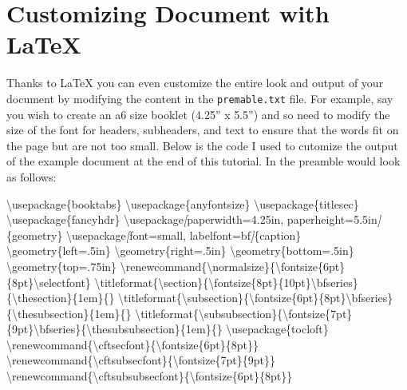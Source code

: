 \documentclass[
]{book}
\newenvironment{Shaded}{\begin{snugshade}}{\end{snugshade}}
\newcommand{\CommentTok}[1]{\textcolor[rgb]{0.56,0.35,0.01}{\textit{#1}}}
\newcommand{\NormalTok}[1]{#1}
\newcommand{\OtherTok}[1]{\textcolor[rgb]{0.56,0.35,0.01}{#1}}
\theoremstyle{definition}
\theoremstyle{definition}
\theoremstyle{definition}
\theoremstyle{definition}
\theoremstyle{remark}
\begin{document}
\section{Customizing Document with LaTeX}\label{customizing-document-with-latex}

Thanks to LaTeX you can even customize the entire look and output of your document by modifying the content in the \texttt{premable.txt} file. For example, say you wish to create an a6 size booklet (4.25'' x 5.5'') and so need to modify the size of the font for headers, subheaders, and text to ensure that the words fit on the page but are not too small. Below is the code I used to cutomize the output of the example document at the end of this tutorial. In the preamble would look as follows:

\begin{Shaded}
\begin{Highlighting}[]
\NormalTok{\textbackslash{}usepackage\{booktabs\}}
\NormalTok{\textbackslash{}usepackage\{anyfontsize\}}
\NormalTok{\textbackslash{}usepackage\{titlesec\}}
\NormalTok{\textbackslash{}usepackage\{fancyhdr\}}
\NormalTok{\textbackslash{}usepackage}\CommentTok{[}\OtherTok{paperwidth=4.25in, paperheight=5.5in}\CommentTok{]}\NormalTok{\{geometry\}}
\NormalTok{\textbackslash{}usepackage}\CommentTok{[}\OtherTok{font=small, labelfont=bf}\CommentTok{]}\NormalTok{\{caption\}}
\NormalTok{\textbackslash{}geometry\{left=.5in\}}
\NormalTok{\textbackslash{}geometry\{right=.5in\}}
\NormalTok{\textbackslash{}geometry\{bottom=.5in\}}
\NormalTok{\textbackslash{}geometry\{top=.75in\}}
\NormalTok{\textbackslash{}renewcommand\{\textbackslash{}normalsize\}\{\textbackslash{}fontsize\{6pt\}\{8pt\}\textbackslash{}selectfont\}}
\NormalTok{\textbackslash{}titleformat\{\textbackslash{}section\}\{\textbackslash{}fontsize\{8pt\}\{10pt\}\textbackslash{}bfseries\}\{\textbackslash{}thesection\}\{1em\}\{\}}
\NormalTok{\textbackslash{}titleformat\{\textbackslash{}subsection\}\{\textbackslash{}fontsize\{6pt\}\{8pt\}\textbackslash{}bfseries\}\{\textbackslash{}thesubsection\}\{1em\}\{\}}
\NormalTok{\textbackslash{}titleformat\{\textbackslash{}subsubsection\}\{\textbackslash{}fontsize\{7pt\}\{9pt\}\textbackslash{}bfseries\}\{\textbackslash{}thesubsubsection\}\{1em\}\{\}}
\NormalTok{\textbackslash{}usepackage\{tocloft\}}
\NormalTok{\textbackslash{}renewcommand\{\textbackslash{}cftsecfont\}\{\textbackslash{}fontsize\{6pt\}\{8pt\}\}}
\NormalTok{\textbackslash{}renewcommand\{\textbackslash{}cftsubsecfont\}\{\textbackslash{}fontsize\{7pt\}\{9pt\}\}}
\NormalTok{\textbackslash{}renewcommand\{\textbackslash{}cftsubsubsecfont\}\{\textbackslash{}fontsize\{6pt\}\{8pt\}\}}

\end{Highlighting}
\end{Shaded}
\end{document}
